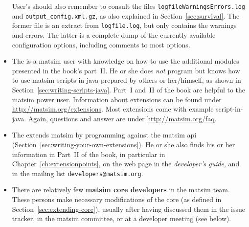 \begin{itemize}
User's should also remember to consult the files \lstinline{logfileWarningsErrors.log} and \lstinline{output_config.xml.gz}, as also explained in Section~\ref{sec:survival}.  The former file is an extract from \lstinline{logfile.log}, but only contains the warnings and errors.  The latter is a complete dump of the currently available configuration options, including comments to most options.
%
\item The  is a \gls{matsim} user with knowledge on how to use the additional modules presented in the book's part~II. He or she does \emph{not} program but knows how to use \gls{matsim} scripts-in-\gls{java} prepared by others or her/himself, as shown in Section~\ref{sec:writing-scripts-java}. Part~I and~II of the book are helpful to the \gls{matsim} power user.  Information about \glspl{extension} can be found under \url{http://matsim.org/extensions}.  Most \glspl{extension} come with example script-in-\gls{java}.  Again, questions and answer are under \url{http://matsim.org/faq}.
%
\item The  extends \gls{matsim} by programming against the \gls{matsim} \gls{api} (Section~\ref{sec:writing-your-own-extensions}). He or she also finds his or her information in Part~II of the book, in particular in Chapter~\ref{ch:extensionpoints}, on the web page in 
the \emph{developer's guide}, and in the mailing list \lstinline|developers@matsim.org|.
%
%
\item There are relatively few \textbf{\gls{matsim} core developers} in the \gls{matsim} team. 
These 
persons make necessary modifications of the core (as defined in Section~\ref{sec:extending-core}), usually after having discussed them in the issue tracker, in the \gls{matsim} committee, or at a developer meeting (see below). 
%
\end{itemize}
%
